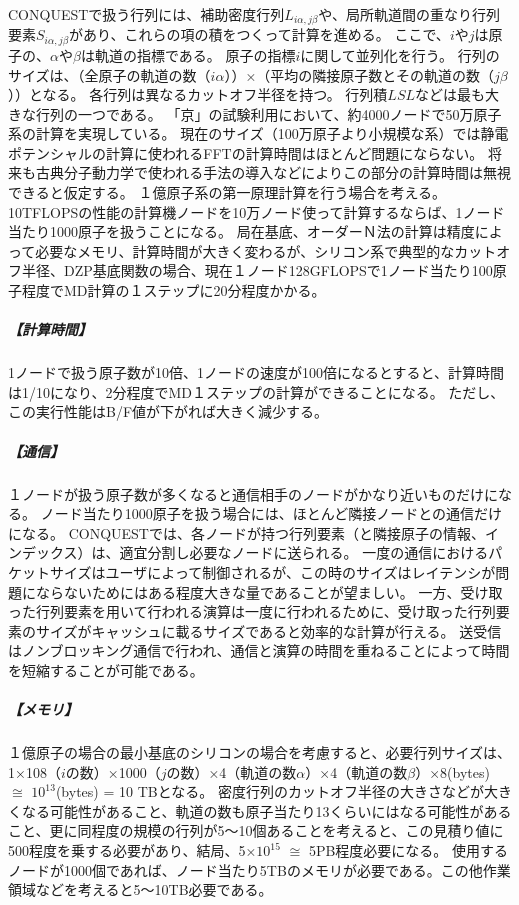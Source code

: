 CONQUESTで扱う行列には、補助密度行列$L_{i\alpha,j\beta}$や、局所軌道間の重なり行列要素$S_{i\alpha,j\beta}$があり、これらの項の積をつくって計算を進める。
ここで、$i$や$j$は原子の、$\alpha$や$\beta$は軌道の指標である。
原子の指標$i$に関して並列化を行う。
行列のサイズは、（全原子の軌道の数（$i\alpha$））×（平均の隣接原子数とその軌道の数（$j\beta$））となる。
各行列は異なるカットオフ半径を持つ。
行列積$LSL$などは最も大きな行列の一つである。
「京」の試験利用において、約4000ノードで50万原子系の計算を実現している。
現在のサイズ（100万原子より小規模な系）では静電ポテンシャルの計算に使われるFFTの計算時間はほとんど問題にならない。
将来も古典分子動力学で使われる手法の導入などによりこの部分の計算時間は無視できると仮定する。
１億原子系の第一原理計算を行う場合を考える。
10TFLOPSの性能の計算機ノードを10万ノード使って計算するならば、1ノード当たり1000原子を扱うことになる。
局在基底、オーダーＮ法の計算は精度によって必要なメモリ、計算時間が大きく変わるが、シリコン系で典型的なカットオフ半径、DZP基底関数の場合、現在１ノード128GFLOPSで1ノード当たり100原子程度でMD計算の１ステップに20分程度かかる。

\subparagraph{【計算時間】}
1ノードで扱う原子数が10倍、1ノードの速度が100倍になるとすると、計算時間は1/10になり、2分程度でMD１ステップの計算ができることになる。
ただし、この実行性能はB/F値が下がれば大きく減少する。

\subparagraph{【通信】}
１ノードが扱う原子数が多くなると通信相手のノードがかなり近いものだけになる。
ノード当たり1000原子を扱う場合には、ほとんど隣接ノードとの通信だけになる。
CONQUESTでは、各ノードが持つ行列要素（と隣接原子の情報、インデックス）は、適宜分割し必要なノードに送られる。
一度の通信におけるパケットサイズはユーザによって制御されるが、この時のサイズはレイテンシが問題にならないためにはある程度大きな量であることが望ましい。
一方、受け取った行列要素を用いて行われる演算は一度に行われるために、受け取った行列要素のサイズがキャッシュに載るサイズであると効率的な計算が行える。
送受信はノンブロッキング通信で行われ、通信と演算の時間を重ねることによって時間を短縮することが可能である。

\subparagraph{【メモリ】}
１億原子の場合の最小基底のシリコンの場合を考慮すると、必要行列サイズは、1×108（$i$の数）×1000（$j$の数）×4（軌道の数$\alpha$）×4（軌道の数$\beta$）×8(bytes) $\cong$ $10^{13}$(bytes) = 10 TBとなる。
密度行列のカットオフ半径の大きさなどが大きくなる可能性があること、軌道の数も原子当たり13くらいにはなる可能性があること、更に同程度の規模の行列が5～10個あることを考えると、この見積り値に500程度を乗する必要があり、結局、5×$10^{15}$ $\cong$ 5PB程度必要になる。
使用するノードが1000個であれば、ノード当たり5TBのメモリが必要である。この他作業領域などを考えると5～10TB必要である。

